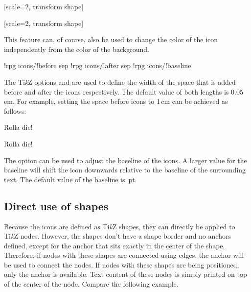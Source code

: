 \documentclass[a4paper]{article}
\begin{document}
\begin{codeexample}
\colorbox{blue!50}{%
        [scale=2, transform shape]%
}

\colorbox{blue!50}{%
        [scale=2, transform shape]%
}
\end{codeexample}
This feature can, of course, also be used to change the color of the icon independently from the color of the background.

\begin{macrodef}
!rpg icons/!before sep
!rpg icons/!after sep
!rpg icons/!baseline
\end{macrodef}
The Ti\emph{k}Z options  and  are used to define the width of the space that is added before and after the icons respectively. The default value of both lengths is 0.05\,em. For example, setting the space before icons to 1\,cm can be achieved as follows:

\begin{codeexample}
Rolla die!

Rolla die!
\end{codeexample}

The option  can be used to adjust the baseline of the icons. A larger value for the baseline will shift the icon downwards relative to the baseline of the surrounding text. The default value of the baseline is \,pt.

\subsection{Direct use of shapes}

Because the icons are defined as Ti\emph{k}Z shapes, they can directly be applied to Ti\emph{k}Z nodes. However, the shapes don't have a shape border and no anchors defined, except for the  anchor that sits exactly in the center of the shape. Therefore, if nodes with these shapes are connected using edges, the  anchor will be used to connect the nodes. If nodes with these shapes are being positioned, only the  anchor is available. Text content of these nodes is simply printed on top of the center of the node. Compare the following example.

\begin{codeexample}
\end{codeexample}
\end{document}
